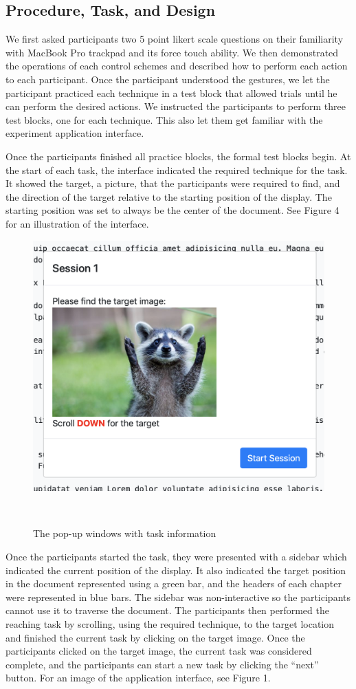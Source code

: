 \documentclass{sigchi}
\begin{document}
\subsection{Procedure, Task, and Design}
We first asked participants two 5 point likert scale questions on their familiarity with MacBook Pro trackpad and its force touch ability. We then demonstrated the operations of each control schemes and described how to perform each action to each participant. Once the participant understood the gestures, we let the participant practiced each technique in a test block that allowed trials until he can perform the desired actions. We instructed the participants to perform three test blocks, one for each technique. This also let them get familiar with the experiment application interface.

Once the participants finished all practice blocks, the formal test blocks begin. At the start of each task, the interface indicated the required technique for the task. It showed the target, a picture, that the participants were required to find, and the direction of the target relative to the starting position of the display. The starting position was set to always be the center of the document. See Figure 4 for an illustration of the interface.

\begin{figure}[!h]
    \centering
    \includegraphics[width=0.7\columnwidth]{figures/figure3}
    \caption{The pop-up windows with task information}~\label{fig:figure4}
\end{figure}

Once the participants started the task, they were presented with a sidebar which indicated the current position of the display. It also indicated the target position in the document represented using a green bar, and the headers of each chapter were represented in blue bars. The sidebar was non-interactive so the participants cannot use it to traverse the document. The participants then performed the reaching task by scrolling, using the required technique, to the target location and finished the current task by clicking on the target image. Once the participants clicked on the target image, the current task was considered complete, and the participants can start a new task by clicking the ``next'' button. For an image of the application interface, see Figure 1.
\end{document}
